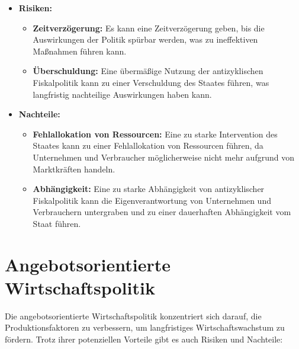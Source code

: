 \documentclass[12pt,a4paper]{report}
\begin{document}
	\begin{itemize}
	    \item \textbf{Risiken:}
	    \begin{itemize}
	        \item \textbf{Zeitverzögerung:} Es kann eine Zeitverzögerung geben, bis die Auswirkungen der Politik spürbar werden, was zu ineffektiven Maßnahmen führen kann.
	        \item \textbf{Überschuldung:} Eine übermäßige Nutzung der antizyklischen Fiskalpolitik kann zu einer Verschuldung des Staates führen, was langfristig nachteilige Auswirkungen haben kann.
	   \end{itemize}    
	   \item \textbf{Nachteile:}
    	\begin{itemize}
        	\item \textbf{Fehlallokation von Ressourcen:} Eine zu starke Intervention des Staates kann zu einer Fehlallokation von Ressourcen führen, da Unternehmen und Verbraucher möglicherweise nicht mehr aufgrund von Marktkräften handeln.
       	\item \textbf{Abhängigkeit:} Eine zu starke Abhängigkeit von antizyklischer Fiskalpolitik kann die Eigenverantwortung von Unternehmen und Verbrauchern untergraben und zu einer dauerhaften Abhängigkeit vom Staat führen.
   	\end{itemize}
	\end{itemize}

\section{Angebotsorientierte Wirtschaftspolitik}
Die angebotsorientierte Wirtschaftspolitik konzentriert sich darauf, die Produktionsfaktoren zu verbessern, um langfristiges Wirtschaftswachstum zu fördern. Trotz ihrer potenziellen Vorteile gibt es auch Risiken und Nachteile:
\end{document}
